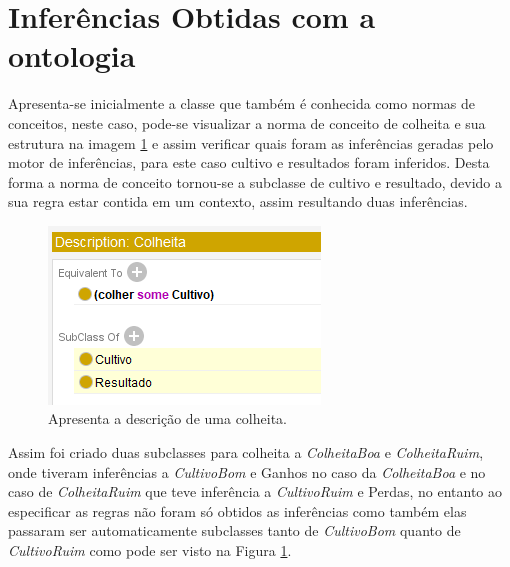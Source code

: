 \documentclass{article}
\begin{document}
\section{Inferências Obtidas com a ontologia }
    



    Apresenta-se inicialmente a classe que também é conhecida como normas de conceitos, neste caso, pode-se visualizar a norma de conceito de colheita e sua estrutura na imagem \ref{figura:descricaoColheta} e assim verificar quais foram as inferências geradas pelo motor de inferências, para este caso cultivo e resultados foram inferidos. Desta forma a norma de conceito tornou-se a subclasse de cultivo e resultado, devido a sua regra estar contida em um contexto, assim resultando duas inferências. 

    
    \begin{figure}[!htp]
        \centering %
        \includegraphics[width=.5\textwidth]{imagens/Inf_1.png} %
        \caption{Apresenta a descrição de uma colheita.}
        \label{figura:descricaoColheta}
    \end{figure}


    Assim foi criado duas subclasses para colheita a \textit{ColheitaBoa} e \textit{ColheitaRuim}, onde tiveram inferências a \textit{CultivoBom} e Ganhos no caso da \textit{ColheitaBoa} e no caso de \textit{ColheitaRuim} que teve inferência a \textit{CultivoRuim} e Perdas, no entanto ao especificar as regras não foram só obtidos as inferências como também elas passaram ser  automaticamente subclasses tanto de \textit{CultivoBom} quanto de \textit{CultivoRuim} como pode ser visto na Figura \ref{figura:descricaoColheta}.
    
\end{document}
